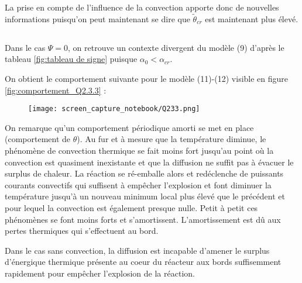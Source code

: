 \documentclass[10pt,a4paper,twocolumn]{report}
\begin{document}
La prise en compte de l'influence de la convection apporte donc de nouvelles informations puisqu'on peut maintenant se dire que $\tilde{\theta}_{cr}$ est maintenant plus élevé.

\subsection{}%

Dans le cas $\Psi = 0$, on retrouve un contexte divergent du modèle (9) d'après le tableau \ref{fig:tableau de signe} puisque $\alpha_0 < \alpha_{cr}$.

On obtient le comportement suivante pour le modèle (11)-(12) visible en figure \ref{fig:comportement_Q2.3.3} :

\begin{figure*}
		\centering
		\begin{subfigure}{}
        	\texttt{[image: screen\_capture\_notebook/Q233.png]}
    	\end{subfigure}
		
   	\caption{Comportement du modèle (11)-(12) pour $\alpha_0 = 2.7$ et $\theta_c = 1.01$.}
    \label{fig:comportement_Q2.3.3}
\end{figure*}

On remarque qu'un comportement périodique amorti se met en place (comportement de $\theta$). Au fur et à mesure que la température diminue, le phénomène de convection thermique se fait moins fort jusqu'au point où la convection est quasiment inexistante et que la diffusion ne suffit pas à évacuer le surplus de chaleur. La réaction se ré-emballe alors et redéclenche de puissants courants convectifs qui suffisent à empêcher l'explosion et font diminuer la température jusqu'à un nouveau minimum local plus élevé que le précédent et pour lequel la convection est également presque nulle. Petit à petit ces phénomènes se font moins forts et s'amortissent. L'amortissement est dû aux pertes thermiques qui s'effectuent au bord.

Dans le cas sans convection, la diffusion est incapable d'amener le surplus d'énergique thermique présente au coeur du réacteur aux bords suffisemment rapidement pour empêcher l'explosion de la réaction.

\subsection{} %
\subsubsection{} %
\end{document}
